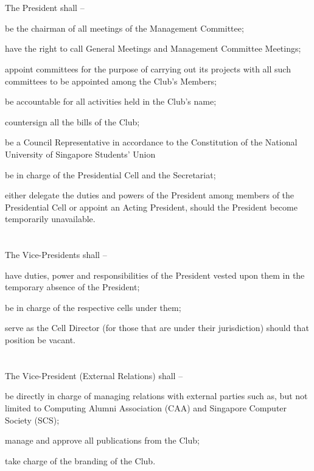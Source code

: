 
\section{}
The President shall –
	\begin{legal}
	\item be the chairman of all meetings of the Management Committee;
	\item have the right to call General Meetings and Management Committee Meetings;
	\item appoint committees for the purpose of carrying out its projects with all such committees to be appointed among the Club's Members;
	\item be accountable for all activities held in the Club's name;
	\item countersign all the bills of the Club;
	\item be a Council Representative in accordance to the Constitution of the National University of Singapore Students' Union
	\item be in charge of the Presidential Cell and the Secretariat;
	\item either delegate the duties and powers of the President among members of the Presidential Cell or appoint an Acting President, should the President become temporarily unavailable.
	\end{legal}

\section{}
The Vice-Presidents shall –
	\begin{legal}
	\item have duties, power and responsibilities of the President vested upon them in the temporary absence of the President;
	\item be in charge of the respective cells under them;
	\item serve as the Cell Director (for those that are under their jurisdiction) should that position be vacant.
	\end{legal}

\section{}
The Vice-President (External Relations) shall –
	\begin{legal}
	\item be directly in charge of managing relations with external parties such as, but not limited to Computing Alumni Association (CAA) and Singapore Computer Society (SCS);
	\item manage and approve all publications from the Club;
	\item take charge of the branding of the Club.
	\end{legal}

